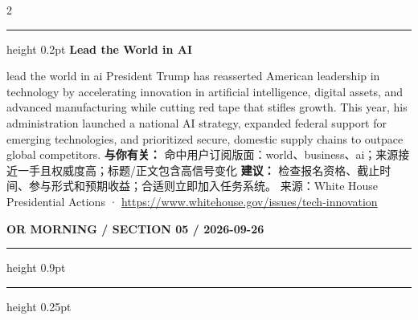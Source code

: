 \documentclass[10.5pt]{ctexart}
\begin{document}
\begin{multicols}{2}
\vspace{2mm}
\hrule height 0.2pt
\vspace{2mm}
{\large\bfseries Lead the World in AI}\par
lead the world in ai President Trump has reasserted American leadership in technology by accelerating innovation in artificial intelligence, digital assets, and advanced manufacturing while cutting red tape that stifles growth. This year, his administration launched a national AI strategy, expanded federal support for emerging technologies, and prioritized secure, domestic supply chains to outpace global competitors.
\textbf{与你有关：} 命中用户订阅版面：world、business、ai；来源接近一手且权威度高；标题/正文包含高信号变化
\textbf{建议：} 检查报名资格、截止时间、参与形式和预期收益；合适则立即加入任务系统。
{\footnotesize\color{ormuted} 来源：White House Presidential Actions · \url{https://www.whitehouse.gov/issues/tech-innovation}}
\end{multicols}
\newpage
{\small\bfseries OR MORNING / SECTION 05 / 2026-09-26}
\vspace{2mm}
\hrule height 0.9pt
\vspace{1.5mm}
\hrule height 0.25pt
\vspace{4mm}
\end{document}
